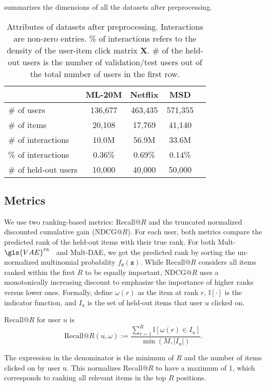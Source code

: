 \documentclass[sigconf]{acmart}
\newcommand{\mathbold}[1]{\ensuremath{\boldsymbol{\mathbf{#1}}}}
\newcommand{\mbz}{\mathbold{z}}
\newcommand{\mbX}{\mathbold{X}}
\newcommand{\mvae}{{\small Mult-}$\gls{VAE}^{\text{\sc pr}}$}
\newcommand{\mdae}{{\small Mult-}\gls{DAE}}
\begin{document}
 summarizes the dimensions
of all the datasets after preprocessing.

\begin{table}
\begin{center}
\caption{Attributes of datasets after preprocessing. Interactions
are non-zero entries. \%  of interactions refers to the density of the user-item
click matrix $\mbX$. \# of the held-out users is the number of validation/test users out of the total number of users in the first row. }
\begin{tabular}{ l c c c c }
  \toprule
   & \textbf{ML-20M} & \textbf{Netflix} & \textbf{MSD}  \\
  \midrule
  \# of users & 136,677 & 463,435 & 571,355  \\
  \# of items & 20,108 & 17,769 & 41,140  \\
  \# of interactions & 10.0M & 56.9M & 33.6M\\
  \% of interactions & 0.36\% & 0.69\% & 0.14\% \\
  \midrule
  \# of held-out users & 10,000 & 40,000 & 50,000 \\
  \bottomrule
\end{tabular}
\label{tab:data}
\end{center}
\end{table}

\subsection{Metrics}\label{sec:exp_metrics}

We use two ranking-based metrics: Recall@$R$ and the truncated normalized
discounted cumulative gain (NDCG@$R$). For each user, both metrics compare the predicted rank of the held-out items with their
true rank. For both \mvae~ and \mdae, we get the predicted rank by sorting the un-normalized multinomial probability $f_\theta(\mbz)$. While Recall@$R$ considers all items ranked within
the first $R$ to be equally important, NDCG@$R$ uses
a monotonically increasing discount to emphasize the importance
of higher ranks versus lower ones. Formally, define $\omega(r)$ as the item at rank $r$, $\mathbb{I}[\cdot]$ is the indicator function, and $I_u$ is the set of held-out items that user $u$ clicked on.

Recall@$R$ for user $u$ is
\[
\textrm{Recall@}R(u, \omega) :=  \frac{\sum_{r=1}^R \mathbb{I}[\omega(r) \in I_u]}{\min(M, |I_u|)}.
\]

The expression in the denominator is the minimum
of $R$ and the number of items clicked on by user
u. This normalizes Recall@$R$ to have a maximum of 1,
which corresponds to ranking all relevant items in the top
$R$ positions.
\end{document}
